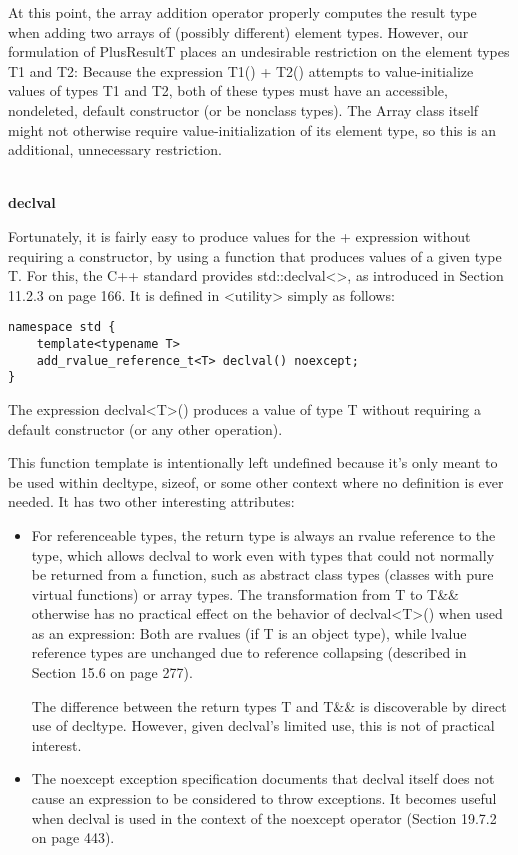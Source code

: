 At this point, the array addition operator properly computes the result type when adding two arrays of (possibly different) element types. However, our formulation of PlusResultT places an undesirable restriction on the element types T1 and T2: Because the expression T1() + T2() attempts to value-initialize values of types T1 and T2, both of these types must have an accessible, nondeleted, default constructor (or be nonclass types). The Array class itself might not otherwise require value-initialization of its element type, so this is an additional, unnecessary restriction.

\hspace*{\fill} \\ %
\noindent
\textbf{declval}

Fortunately, it is fairly easy to produce values for the + expression without requiring a constructor, by using a function that produces values of a given type T. For this, the C++ standard provides std::declval<>, as introduced in Section 11.2.3 on page 166. It is defined in <utility> simply as follows:

\begin{lstlisting}[style=styleCXX]
namespace std {
	template<typename T>
	add_rvalue_reference_t<T> declval() noexcept;
}
\end{lstlisting}

The expression declval<T>() produces a value of type T without requiring a default constructor (or any other operation).

This function template is intentionally left undefined  because it’s only meant to be used within decltype, sizeof, or some other context where no definition is ever needed. It has two other interesting attributes:

\begin{itemize}
\item 
For referenceable types, the return type is always an rvalue reference to the type, which allows declval to work even with types that could not normally be returned from a function, such as abstract class types (classes with pure virtual functions) or array types. The transformation from T to T\&\& otherwise has no practical effect on the behavior of declval<T>() when used as an expression: Both are rvalues (if T is an object type), while lvalue reference types are unchanged due to reference collapsing (described in Section 15.6 on page 277).

\begin{tcolorbox}[colback=webgreen!5!white,colframe=webgreen!75!black]
\hspace*{0.75cm}The difference between the return types T and T\&\& is discoverable by direct use of decltype. However, given declval’s limited use, this is not of practical interest.
\end{tcolorbox}

\item 
The noexcept exception specification documents that declval itself does not cause an expression to be considered to throw exceptions. It becomes useful when declval is used in the context of the noexcept operator (Section 19.7.2 on page 443).
\end{itemize}

